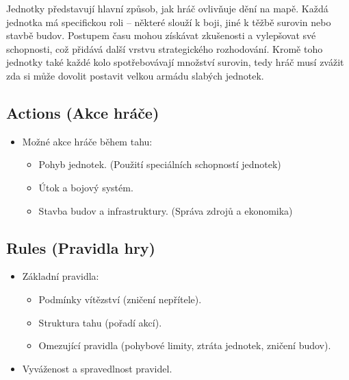 Jednotky představují hlavní způsob, jak hráč ovlivňuje dění na mapě. Každá jednotka má specifickou roli – některé slouží k boji, jiné k těžbě surovin nebo stavbě budov. Postupem času mohou získávat zkušenosti a vylepšovat své schopnosti, což přidává další vrstvu strategického rozhodování. Kromě toho jednotky také každé kolo spotřebovávají množství surovin, tedy hráč musí zvážit zda si může dovolit postavit velkou armádu slabých jednotek.



\subsection{Actions (Akce hráče)}
\begin{itemize}
    \item Možné akce hráče během tahu:
    \begin{itemize}
        \item Pohyb jednotek. (Použití speciálních schopností jednotek)
        \item Útok a bojový systém. 
        \item Stavba budov a infrastruktury. (Správa zdrojů a ekonomika)
    \end{itemize}
\end{itemize}

\subsection{Rules (Pravidla hry)}
\begin{itemize}
    \item Základní pravidla:
    \begin{itemize}
        \item Podmínky vítězství (zničení nepřítele).
        \item Struktura tahu (pořadí akcí).
        \item Omezující pravidla (pohybové limity, ztráta jednotek, zničení budov).
    \end{itemize}
    \item Vyváženost a spravedlnost pravidel.
\end{itemize}

